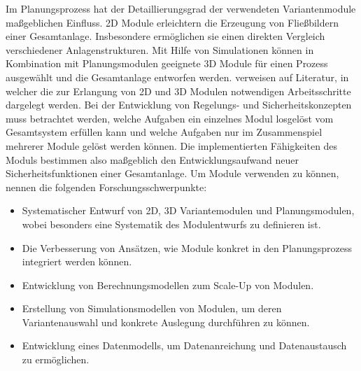 Im Planungsprozess hat der Detaillierungsgrad der verwendeten Variantenmodule ma\ss{}geblichen Einfluss. 2D Module erleichtern die Erzeugung von Flie\ss{}bildern einer Gesamtanlage. Insbesondere erm\"oglichen sie einen direkten Vergleich verschiedener Anlagenstrukturen. Mit Hilfe von Simulationen k\"onnen in Kombination mit Planungsmodulen geeignete 3D Module f\"ur einen Prozess ausgew\"ahlt und die Gesamtanlage entworfen werden. \citeauthor{Bramsiepe_2012} verweisen auf Literatur, in welcher die zur Erlangung von 2D und 3D Modulen notwendigen Arbeitsschritte dargelegt werden. \newline
Bei der Entwicklung von Regelungs- und Sicherheitskonzepten muss betrachtet werden, welche Aufgaben ein einzelnes Modul losgel\"ost vom Gesamtsystem erf\"ullen kann und welche Aufgaben nur im Zusammenspiel mehrerer Module gel\"ost werden k\"onnen. Die implementierten F\"ahigkeiten des Moduls bestimmen also ma\ss{}geblich den Entwicklungsaufwand neuer Sicherheitsfunktionen einer Gesamtanlage. \newline
Um Module verwenden zu k\"onnen, nennen \citeauthor{Bramsiepe_2012} die folgenden Forschungsschwerpunkte:
\begin{itemize}
\item Systematischer Entwurf von 2D, 3D Variantemodulen und Planungsmodulen, wobei besonders eine Systematik des Modulentwurfs zu definieren ist.
\item Die Verbesserung von Ans\"atzen, wie Module konkret in den Planungsprozess integriert werden k\"onnen.
\item Entwicklung von Berechnungsmodellen zum Scale-Up von Modulen.
\item Erstellung von Simulationsmodellen von Modulen, um deren Variantenauswahl und konkrete Auslegung durchf\"uhren zu k\"onnen.
\item Entwicklung eines Datenmodells, um Datenanreichung und Datenaustausch zu erm\"oglichen.
\end{itemize}

